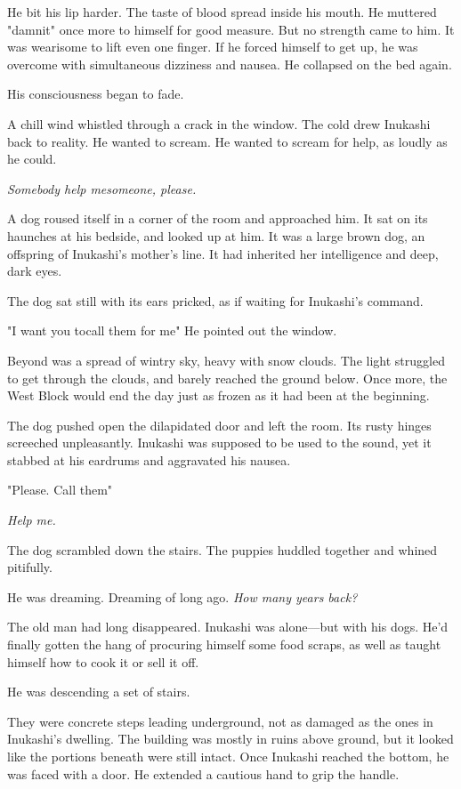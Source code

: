 He bit his lip harder. The taste of blood spread inside his mouth. He
muttered "damnit" once more to himself for good measure. But no strength
came to him. It was wearisome to lift even one finger. If he forced
himself to get up, he was overcome with simultaneous dizziness and
nausea. He collapsed on the bed again.

His consciousness began to fade.

A chill wind whistled through a crack in the window. The cold drew
Inukashi back to reality. He wanted to scream. He wanted to scream for
help, as loudly as he could.

\emph{Somebody help me\el someone, please.}

A dog roused itself in a corner of the room and approached him. It sat
on its haunches at his bedside, and looked up at him. It was a large
brown dog, an offspring of Inukashi's mother's line. It had inherited
her intelligence and deep, dark eyes.

The dog sat still with its ears pricked, as if waiting for Inukashi's
command.

"\el I want you to\el call them for me\el " He pointed out the window.

Beyond was a spread of wintry sky, heavy with snow clouds. The light
struggled to get through the clouds, and barely reached the ground
below. Once more, the West Block would end the day just as frozen as it
had been at the beginning.

The dog pushed open the dilapidated door and left the room. Its rusty
hinges screeched unpleasantly. Inukashi was supposed to be used to the
sound, yet it stabbed at his eardrums and aggravated his nausea.

"Please. Call them\el "

\emph{Help me.}

The dog scrambled down the stairs. The puppies huddled together and
whined pitifully.

\mybreak

He was dreaming. Dreaming of long ago. \emph{How many years back?}

The old man had long disappeared. Inukashi was alone---but with his dogs.
He'd finally gotten the hang of procuring himself some food scraps, as
well as taught himself how to cook it or sell it off.

He was descending a set of stairs.

They were concrete steps leading underground, not as damaged as the ones
in Inukashi's dwelling. The building was mostly in ruins above ground,
but it looked like the portions beneath were still intact. Once Inukashi
reached the bottom, he was faced with a door. He extended a cautious
hand to grip the handle.


